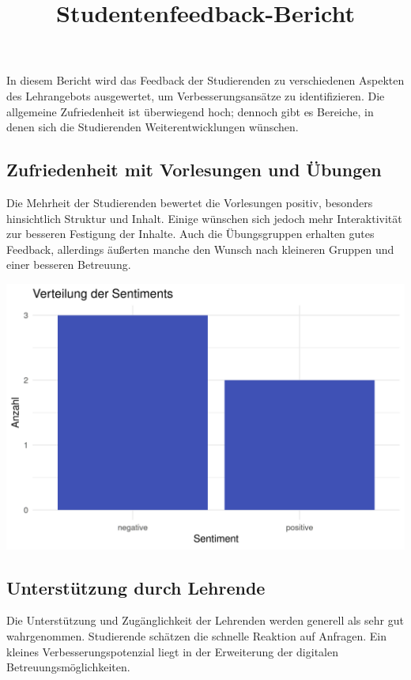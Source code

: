 \documentclass[
]{article}
\title{Studentenfeedback-Bericht}
\author{}
\date{\vspace{-2.5em}}
\begin{document}
\maketitle

In diesem Bericht wird das Feedback der Studierenden zu verschiedenen
Aspekten des Lehrangebots ausgewertet, um Verbesserungsansätze zu
identifizieren. Die allgemeine Zufriedenheit ist überwiegend hoch;
dennoch gibt es Bereiche, in denen sich die Studierenden
Weiterentwicklungen wünschen.

\subsection{Zufriedenheit mit Vorlesungen und
Übungen}\label{zufriedenheit-mit-vorlesungen-und-uxfcbungen}

Die Mehrheit der Studierenden bewertet die Vorlesungen positiv,
besonders hinsichtlich Struktur und Inhalt. Einige wünschen sich jedoch
mehr Interaktivität zur besseren Festigung der Inhalte. Auch die
Übungsgruppen erhalten gutes Feedback, allerdings äußerten manche den
Wunsch nach kleineren Gruppen und einer besseren Betreuung.

\includegraphics{Analyse_Diagramm1.png}

\subsection{Unterstützung durch
Lehrende}\label{unterstuxfctzung-durch-lehrende}

Die Unterstützung und Zugänglichkeit der Lehrenden werden generell als
sehr gut wahrgenommen. Studierende schätzen die schnelle Reaktion auf
Anfragen. Ein kleines Verbesserungspotenzial liegt in der Erweiterung
der digitalen Betreuungsmöglichkeiten.
\end{document}
